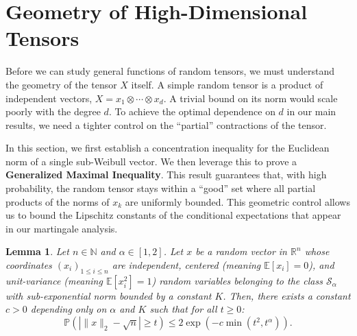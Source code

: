 \documentclass[11pt]{amsart}
\newtheorem{lemma}[theorem]{Lemma}
\theoremstyle{definition}
\theoremstyle{remark}
\begin{document}
\section{Geometry of High-Dimensional Tensors}

Before we can study general functions of random tensors, we must understand the geometry of the tensor $X$ itself. A simple random tensor is a product of independent vectors, $X = x_1 \otimes \cdots \otimes x_d$. A trivial bound on its norm would scale poorly with the degree $d$. To achieve the optimal dependence on $d$ in our main results, we need a tighter control on the ``partial'' contractions of the tensor.

In this section, we first establish a concentration inequality for the Euclidean norm of a single sub-Weibull vector. We then leverage this to prove a \textbf{Generalized Maximal Inequality}. This result guarantees that, with high probability, the random tensor stays within a ``good'' set where all partial products of the norms of $x_k$ are uniformly bounded. This geometric control allows us to bound the Lipschitz constants of the conditional expectations that appear in our martingale analysis.

\begin{lemma}\label{lem:4.1}
Let $n \in \mathbb{N}$ and $\alpha \in [1, 2]$. Let $x$ be a random vector in $\mathbb{R}^n$ whose coordinates $(x_i)_{1 \leq i \leq n}$ are independent, centered (meaning $\mathbb{E}[x_i]=0$), and unit-variance (meaning $\mathbb{E}[x_i^2]=1$) random variables belonging to the class $\mathcal{S}_\alpha$ with sub-exponential norm bounded by a constant $K$. Then, there exists a constant $c > 0$ depending only on $\alpha$ and $K$ such that for all $t \geq 0$:
\begin{equation} \mathbb{P}\left( \left| \|x\|_2 - \sqrt{n} \right| \geq t \right) \leq 2 \exp\left( -c \min\left( t^2, t^\alpha \right) \right). \end{equation}
\end{lemma}
\end{document}
